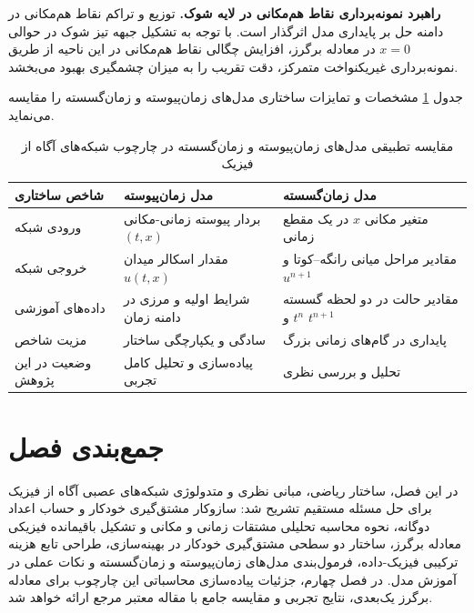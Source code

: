 \textbf{راهبرد نمونه‌برداری نقاط هم‌مکانی در لایه شوک.} توزیع و تراکم نقاط هم‌مکانی در دامنه حل بر پایداری مدل اثرگذار است. با توجه به تشکیل جبهه تیز شوک در حوالی $x=0$ در معادله برگرز، افزایش چگالی نقاط هم‌مکانی در این ناحیه از طریق نمونه‌برداری غیریکنواخت متمرکز، دقت تقریب را به میزان چشمگیری بهبود می‌بخشد.

جدول \ref{tab:models} مشخصات و تمایزات ساختاری مدل‌های زمان‌پیوسته و زمان‌گسسته را مقایسه می‌نماید.

\begin{table}[t]
\caption{مقایسه تطبیقی مدل‌های زمان‌پیوسته و زمان‌گسسته در چارچوب شبکه‌های آگاه از فیزیک}
\label{tab:models}
\centering
\singlespacing
\renewcommand{\arraystretch}{1.25}
\begin{tabular}{|p{2.8cm}|p{5.2cm}|p{5.4cm}|}
\hline
\textbf{شاخص ساختاری} & \textbf{مدل زمان‌پیوسته} & \textbf{مدل زمان‌گسسته} \\
\hline
ورودی شبکه & بردار پیوسته زمانی-مکانی $(t, x)$ & متغیر مکانی $x$ در یک مقطع زمانی \\
\hline
خروجی شبکه & مقدار اسکالر میدان $u(t,x)$ & مقادیر مراحل میانی رانگه--کوتا و $u^{n+1}$ \\
\hline
داده‌های آموزشی & شرایط اولیه و مرزی در دامنه زمان & مقادیر حالت در دو لحظه گسسته $t^n$ و $t^{n+1}$ \\
\hline
مزیت شاخص & سادگی و یکپارچگی ساختار & پایداری در گام‌های زمانی بزرگ \\
\hline
وضعیت در این پژوهش & پیاده‌سازی و تحلیل کامل تجربی & تحلیل و بررسی نظری \\
\hline
\end{tabular}
\end{table}

\section{جمع‌بندی فصل}
\label{sec:ch3-summary}

در این فصل، ساختار ریاضی، مبانی نظری و متدولوژی شبکه‌های عصبی آگاه از فیزیک برای حل مسئله مستقیم تشریح شد: سازوکار مشتق‌گیری خودکار و حساب اعداد دوگانه، نحوه محاسبه تحلیلی مشتقات زمانی و مکانی و تشکیل باقیمانده فیزیکی معادله برگرز، ساختار دو سطحی مشتق‌گیری خودکار در بهینه‌سازی، طراحی تابع هزینه ترکیبی فیزیک-داده، فرمول‌بندی مدل‌های زمان‌پیوسته و زمان‌گسسته و نکات عملی در آموزش مدل. در فصل چهارم، جزئیات پیاده‌سازی محاسباتی این چارچوب برای معادله برگرز یک‌بعدی، نتایج تجربی و مقایسه جامع با مقاله معتبر مرجع ارائه خواهد شد.
